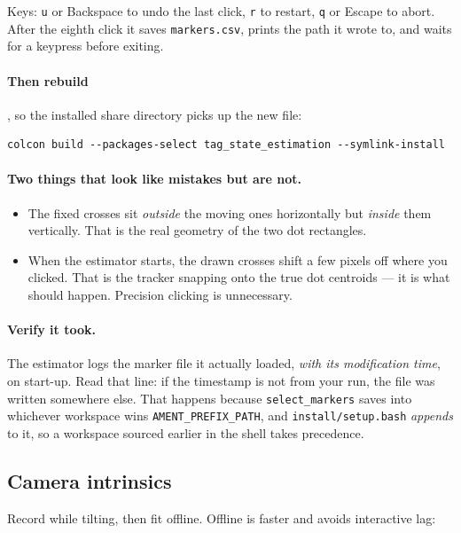 \documentclass[11pt,a4paper]{article}
\newcommand{\cmd}[1]{\texttt{\small #1}}
\newcommand{\file}[1]{\texttt{\small #1}}
\begin{document}
\noindent Keys: \cmd{u} or Backspace to undo the last click, \cmd{r} to restart,
\cmd{q} or Escape to abort. After the eighth click it saves \file{markers.csv},
prints the path it wrote to, and waits for a keypress before exiting.

\paragraph{Then rebuild}, so the installed share directory picks up the new file:
\begin{lstlisting}
colcon build --packages-select tag_state_estimation --symlink-install
\end{lstlisting}

\paragraph{Two things that look like mistakes but are not.}
\begin{itemize}[nosep,left=6mm]
  \item The fixed crosses sit \emph{outside} the moving ones horizontally but
        \emph{inside} them vertically. That is the real geometry of the two dot
        rectangles.
  \item When the estimator starts, the drawn crosses shift a few pixels off where
        you clicked. That is the tracker snapping onto the true dot centroids ---
        it is what should happen. Precision clicking is unnecessary.
\end{itemize}

\paragraph{Verify it took.} The estimator logs the marker file it actually loaded,
\emph{with its modification time}, on start-up. Read that line: if the timestamp
is not from your run, the file was written somewhere else. That happens because
\cmd{select\_markers} saves into whichever workspace wins
\cmd{AMENT\_PREFIX\_PATH}, and \file{install/setup.bash} \emph{appends} to it, so
a workspace sourced earlier in the shell takes precedence.

\subsection{Camera intrinsics}

Record while tilting, then fit offline. Offline is faster and avoids interactive
lag:
\end{document}
